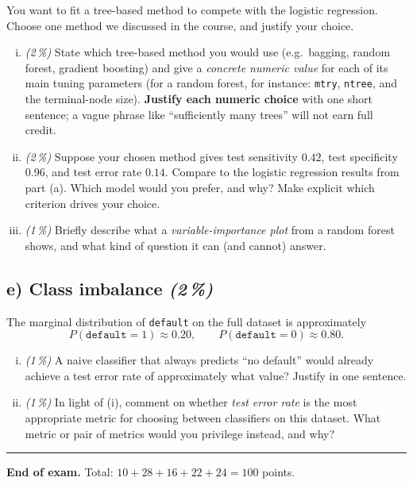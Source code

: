 \documentclass[11pt,a4paper]{article}
\newcommand{\subpoints}[1]{\textit{(#1\,\%)}}
\begin{document}
You want to fit a tree-based method to compete with the logistic regression. Choose one method we discussed in the course, and justify your choice.

\begin{enumerate}[(i)]
  \item \subpoints{2} State which tree-based method you would use (e.g.\ bagging, random forest, gradient boosting) and give a \emph{concrete numeric value} for each of its main tuning parameters (for a random forest, for instance: \texttt{mtry}, \texttt{ntree}, and the terminal-node size). \textbf{Justify each numeric choice} with one short sentence; a vague phrase like ``sufficiently many trees'' will not earn full credit.
  \item \subpoints{2} Suppose your chosen method gives test sensitivity $0.42$, test specificity $0.96$, and test error rate $0.14$. Compare to the logistic regression results from part (a). Which model would you prefer, and why? Make explicit which criterion drives your choice.
  \item \subpoints{1} Briefly describe what a \emph{variable-importance plot} from a random forest shows, and what kind of question it can (and cannot) answer.
\end{enumerate}

\subsection*{e) Class imbalance \subpoints{2}}

The marginal distribution of \texttt{default} on the full dataset is approximately
$$P(\texttt{default} = 1) \approx 0.20, \qquad P(\texttt{default} = 0) \approx 0.80.$$

\begin{enumerate}[(i)]
  \item \subpoints{1} A naive classifier that always predicts ``no default'' would already achieve a test error rate of approximately what value? Justify in one sentence.
  \item \subpoints{1} In light of (i), comment on whether \emph{test error rate} is the most appropriate metric for choosing between classifiers on this dataset. What metric or pair of metrics would you privilege instead, and why?
\end{enumerate}

\vspace{1em}
\hrule
\vspace{0.5em}

\noindent\textbf{End of exam.} \quad Total: $10 + 28 + 16 + 22 + 24 = 100$ points.
\end{document}

